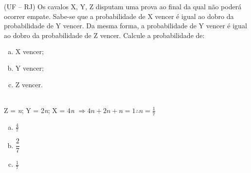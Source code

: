 \begin{ex}
(UF – RJ) Os cavalos X, Y, Z disputam uma prova ao final da qual não poderá ocorrer empate. Sabe-se que a probabilidade de X vencer é igual ao dobro da probabilidade de Y vencer. Da mesma forma, a probabilidade de Y vencer é igual ao dobro da probabilidade de Z vencer. Calcule a probabilidade de:
   \begin{enumerate}[(a)]
   \item X vencer;
   \item Y vencer;
   \item Z vencer.
   \end{enumerate}
     \begin{sol}
       \phantom{A} \\
       Z = \textit{n}; Y = 2\textit{n}; X = 4\textit{n} $\Rightarrow 4n+2n+n=1 \therefore n=\frac{1}{7}$
       \begin{enumerate} [(a)]
           \item $\frac{4}{7}$
           \item $\dfrac{2}{7}$
           \item $\frac{1}{7}$
       \end{enumerate}
     \end{sol}
\end{ex}